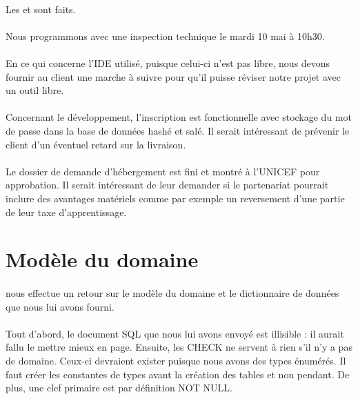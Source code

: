 \documentclass [a4paper] {article}
\begin{document}
\paragraph*{}
Les \PTI{} et \PTU{} sont faits.
\paragraph*{}
Nous programmons avec \nomTuteurPedago{} une inspection technique le mardi 10 mai à 10h30.
\paragraph*{}
En ce qui concerne l'IDE utilisé, puisque celui-ci n'est pas libre, nous devons fournir au client une marche à suivre pour qu'il puisse réviser notre projet avec un outil libre.
\paragraph*{}
Concernant le développement, l'inscription est fonctionnelle avec stockage du mot de passe dans la base de données hashé et salé. Il serait intéressant de prévenir le client d'un éventuel retard sur la livraison.
\paragraph*{}
Le dossier de demande d'hébergement est fini et montré à l'UNICEF pour approbation. Il serait intéressant de leur demander si le partenariat pourrait inclure des avantages matériels comme par exemple un reversement d'une partie de leur taxe d'apprentissage.

\section{Modèle du domaine}
\paragraph*{}
\nomTuteurPedago{} nous effectue un retour sur le modèle du domaine et le dictionnaire de données que nous lui avons fourni.
\paragraph*{}
Tout d'abord, le document SQL que nous lui avons envoyé est illisible : il aurait fallu le mettre mieux en page. Ensuite, les CHECK ne servent à rien s'il n'y a pas de domaine. Ceux-ci devraient exister puisque nous avons des types énumérés. Il faut créer les constantes de types avant la création des tables et non pendant. De plus, une clef primaire est par définition NOT NULL.
\end{document}
